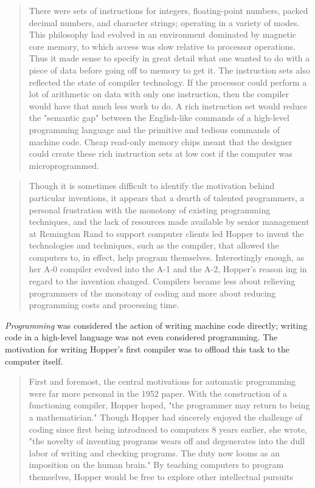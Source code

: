 \begin{quotation}
There were sets of instructions for integers, floating-point numbers, packed decimal numbers, and character
strings; operating in a variety of modes. This philosophy had evolved in an environment dominated by
magnetic core memory, to which access was slow relative to processor operations. Thus it made sense to
specify in great detail what one wanted to do with a piece of data before going off to memory to get it. The
instruction sets also reflected the state of compiler technology. If the processor could perform a lot of
arithmetic on data with only one instruction, then the compiler would have that much less work to do. A rich
instruction set would reduce the "semantic gap" between the English-like commands of a high-level
programming language and the primitive and tedious commands of machine code. Cheap read-only memory
chips meant that the designer could create these rich instruction sets at low cost if the computer was microprogrammed.
\end{quotation}



\begin{quotation}
Though it is sometimes difficult to identify the motivation behind particular 
inventions, it appears that a dearth of talented programmers, a personal 
frustration with the monotony of existing programming techniques, and the lack of resources 
made available by senior management at Remington Rand to support computer 
clients led Hopper to invent the technologies and techniques, such as the compiler, 
that allowed the computers to, in effect, help program themselves. 
Interestingly enough, as her A-0 compiler evolved into the A-1 and the A-2, Hopper’s reason
ing in regard to the invention changed. Compilers became less about relieving 
programmers of the monotony of coding and more about reducing programming costs and processing time.
\end{quotation}

\textit{Programming} was considered the action of writing machine code directly;
writing code in a high-level language was not even considered programming.
The motivation for writing Hopper's first compiler was to offload this task
to the computer itself.

\begin{quotation}
First and
foremost, the central motivations for automatic programming
were far more personal in the 1952 paper. With the construction
of a functioning compiler, Hopper hoped, "the programmer
may return to being a mathematician." Though Hopper had
sincerely enjoyed the challenge of coding since first being introduced to computers 8 years earlier, she wrote, "the novelty of
inventing programs wears off and degenerates into the dull labor
of writing and checking programs. The duty now looms as an
imposition on the human brain." By teaching computers to
program themselves, Hopper would be free to explore other
intellectual pursuits 
\end{quotation}

